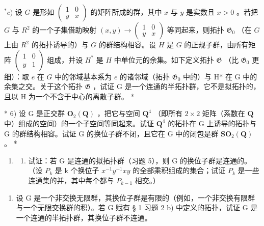 \(^{*}c)\) 设 \(G\) 是形如 \(\begin{pmatrix} 1 & 0 \\ y & x \end{pmatrix}\) 的矩阵所成的群，其中 \(x\) 与 \(y\) 是实数且 \(x > 0\) 。若把 \(G\) 与 \(R^2\) 的一个子集借助映射 \((x, y) \to \begin{pmatrix} 1 & 0 \\ y & x \end{pmatrix}\) 等同起来，则拓扑 \(\mathfrak{G}_0\) （在 \(G\) 上由 \(R^2\) 的拓扑诱导的）与 \(G\) 的群结构相容。设 \(H\) 是 \(G\) 的正规子群，由所有矩阵 \(\begin{pmatrix} 1 & 0 \\ y & 1 \end{pmatrix}\) 组成，并设 \(H^*\) 是 \(H\) 中单位元的余集。如下定义拓扑 \(\mathfrak{G}\) （比 \(\mathfrak{G}_0\) 更细）：取 \(e\) 在 \(G\) 中的邻域基本系为 \(e\) 的诸邻域（拓扑 \(\mathfrak{G}_{0}\) 中的）与 H* 在 G 中的余集之交。关于这个拓扑 \(\mathfrak{G}\) ，试证 G 是一个连通的半拓扑群，它不是拟拓扑的，且以 H 为一个不含于中心的离散子群。 *

* 6) 设 G 是正交群 \(\mathbf{O}_{2}(\mathbf{Q})\) ，把它与空间 \(\mathbf{Q}^{4}\) （即所有 \(2 \times 2\) 矩阵（系数在 \(\mathbf{Q}\) 中）组成的空间）的一个子空间等同起来。试证 \(\mathbf{Q}^{4}\) 的拓扑在 G 上诱导的拓扑与 G 的群结构相容。试证 G 的换位子群不闭，且它在 G 中的闭包是群 \(\mathbf{SO}_{2}(\mathbf{Q})\) 。 *

\begin{enumerate}
\def\labelenumi{\arabic{enumi})}
\setcounter{enumi}{6}
\tightlist
\item
  \begin{enumerate}
  \def\labelenumii{\alph{enumii})}
  \tightlist
  \item
    试证：若 G 是连通的拟拓扑群（习题 5），则 G 的换位子群是连通的。（设 \(P_k\) 是 k 个换位子 \(x^{-1}y^{-1}xy\) 的全部乘积组成的集合；试证 \(P_k\) 是一些连通集的并，其中每个都与 \(P_{k-1}\) 相交。）
  \end{enumerate}
\end{enumerate}

\begin{enumerate}
\def\labelenumi{\alph{enumi})}
\setcounter{enumi}{1}
\tightlist
\item
  设 G 是一个非交换无限群，其换位子群是有限的（例如，一个非交换有限群与一个无限交换群的积）。若 G 赋有 § 1 习题 2 b) 中定义的拓扑，试证 G 是一个连通的半拓扑群，其换位子群不连通。
\end{enumerate}

